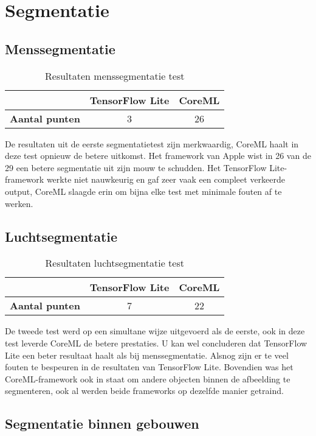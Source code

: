 \section{Segmentatie}
\subsection{Menssegmentatie}
\begin{table}[H]
	\centering
	\begin{tabular}{|c|c|c|}
		\hline
		& \textbf{TensorFlow Lite} & \textbf{CoreML} \\ \hline
		\textbf{Aantal punten} & 3                        & 26              \\ \hline
	\end{tabular}
	\caption{Resultaten menssegmentatie test}
\end{table}

De resultaten uit de eerste segmentatietest zijn merkwaardig, CoreML haalt in deze test opnieuw de betere uitkomst. Het framework van Apple wist in 26 van de 29 een betere segmentatie uit zijn mouw te schudden. Het TensorFlow Lite-framework werkte niet nauwkeurig en gaf zeer vaak een compleet verkeerde output, CoreML slaagde erin om bijna elke test met minimale fouten af te werken.

\subsection{Luchtsegmentatie}
\begin{table}[H]
	\centering
	\begin{tabular}{|c|c|c|}
		\hline
		& \textbf{TensorFlow Lite} & \textbf{CoreML} \\ \hline
		\textbf{Aantal punten} & 7                        & 22              \\ \hline
	\end{tabular}
	\caption{Resultaten luchtsegmentatie test}
\end{table}

De tweede test werd op een simultane wijze uitgevoerd als de eerste, ook in deze test leverde CoreML de betere prestaties. U kan wel concluderen dat TensorFlow Lite een beter resultaat haalt als bij menssegmentatie. Alsnog zijn er te veel fouten te bespeuren in de resultaten van TensorFlow Lite. Bovendien was het CoreML-framework ook in staat om andere objecten binnen de afbeelding te segmenteren, ook al werden beide frameworks op dezelfde manier getraind.
\subsection{Segmentatie binnen gebouwen}

